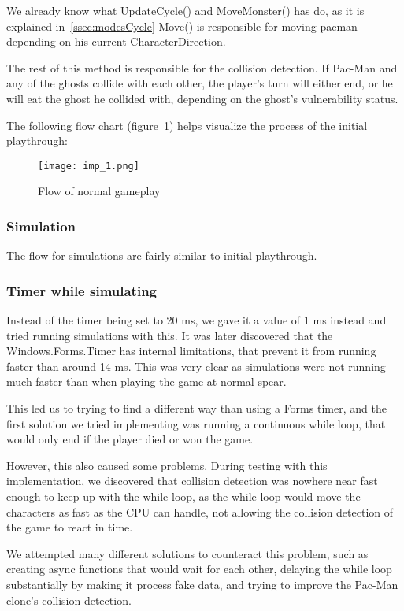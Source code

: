 We already know what UpdateCycle() and MoveMonster() has do, as it is explained in~\ref{ssec:modesCycle} Move() is responsible for moving pacman depending on his current CharacterDirection.

The rest of this method is responsible for the collision detection. If Pac-Man and any of the ghosts collide with each other, the player’s turn will either end, or he will eat the ghost he collided with, depending on the ghost’s vulnerability status.

The following flow chart (figure~\ref{fig:imp1}) helps visualize the process of the initial playthrough:

\begin{figure}[!htbp]
	\centering
	\texttt{[image: imp\_1.png]}
	\caption{Flow of normal gameplay}
	\label{fig:imp1}
\end{figure}

\subsubsection*{Simulation}
The flow for simulations are fairly similar to initial playthrough.

\subsubsection*{Timer while simulating}
Instead of the timer being set to 20 ms, we gave it a value of 1 ms instead and tried running simulations with this. It was later discovered that the Windows.Forms.Timer has internal limitations, that prevent it from running faster than around 14 ms. This was very clear as simulations were not running much faster than when playing the game at normal spear.

This led us to trying to find a different way than using a Forms timer, and the first solution we tried implementing was running a continuous while loop, that would only end if the player died or won the game.

However, this also caused some problems. During testing with this implementation, we discovered that collision detection was nowhere near fast enough to keep up with the while loop, as the while loop would move the characters as fast as the CPU can handle, not allowing the collision detection of the game to react in time.

We attempted many different solutions to counteract this problem, such as creating async functions that would wait for each other, delaying the while loop substantially by making it process fake data, and trying to improve the Pac-Man clone’s collision detection.

